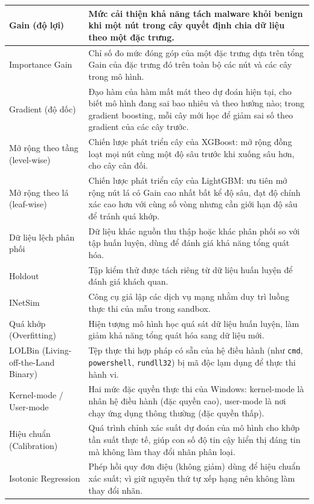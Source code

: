\documentclass[../DoAn.tex]{subfiles}
\begin{document}
\begin{longtable}{|p{3.8cm}|p{10cm}|}
\hline
Gain (độ lợi) & Mức cải thiện khả năng tách malware khỏi benign khi một nút trong cây quyết định chia dữ liệu theo một đặc trưng. \\
\hline
Importance Gain & Chỉ số đo mức đóng góp của một đặc trưng dựa trên tổng Gain của đặc trưng đó trên toàn bộ các nút và các cây trong mô hình. \\
\hline
Gradient (độ dốc) & Đạo hàm của hàm mất mát theo dự đoán hiện tại, cho biết mô hình đang sai bao nhiêu và theo hướng nào; trong gradient boosting, mỗi cây mới học để giảm sai số theo gradient của các cây trước. \\
\hline
Mở rộng theo tầng (level-wise) & Chiến lược phát triển cây của XGBoost: mở rộng đồng loạt mọi nút cùng một độ sâu trước khi xuống sâu hơn, cho cây cân đối. \\
\hline
Mở rộng theo lá (leaf-wise) & Chiến lược phát triển cây của LightGBM: ưu tiên mở rộng nút lá có Gain cao nhất bất kể độ sâu, đạt độ chính xác cao hơn với cùng số vòng nhưng cần giới hạn độ sâu để tránh quá khớp. \\
\hline
Dữ liệu lệch phân phối & Dữ liệu khác nguồn thu thập hoặc khác phân phối so với tập huấn luyện, dùng để đánh giá khả năng tổng quát hóa. \\
\hline
Holdout & Tập kiểm thử được tách riêng từ dữ liệu huấn luyện để đánh giá khách quan. \\
\hline
INetSim & Công cụ giả lập các dịch vụ mạng nhằm duy trì luồng thực thi của mẫu trong sandbox. \\
\hline
Quá khớp (Overfitting) & Hiện tượng mô hình học quá sát dữ liệu huấn luyện, làm giảm khả năng tổng quát hóa sang dữ liệu mới. \\
\hline
LOLBin (Living-off-the-Land Binary) & Tệp thực thi hợp pháp có sẵn của hệ điều hành (như \texttt{cmd}, \texttt{powershell}, \texttt{rundll32}) bị mã độc lạm dụng để thực thi hành vi. \\
\hline
Kernel-mode / User-mode & Hai mức đặc quyền thực thi của Windows: kernel-mode là nhân hệ điều hành (đặc quyền cao), user-mode là nơi chạy ứng dụng thông thường (đặc quyền thấp). \\
\hline
Hiệu chuẩn (Calibration) & Quá trình chỉnh xác suất dự đoán của mô hình cho khớp tần suất thực tế, giúp con số độ tin cậy hiển thị đáng tin mà không làm thay đổi nhãn phân loại. \\
\hline
Isotonic Regression & Phép hồi quy đơn điệu (không giảm) dùng để hiệu chuẩn xác suất; vì giữ nguyên thứ tự xếp hạng nên không làm thay đổi nhãn. \\
\hline
\end{longtable}
\end{document}
